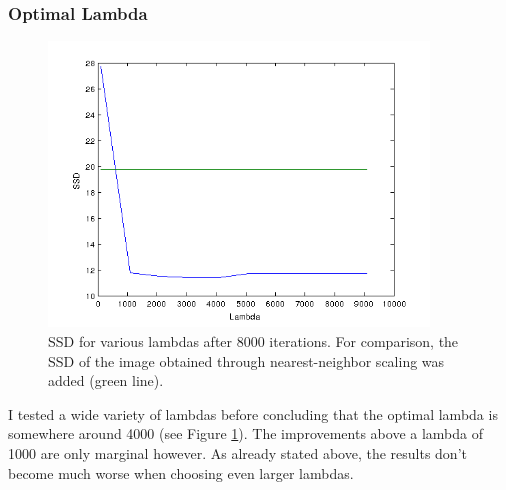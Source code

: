 \documentclass{paper}
\begin{document}
\clearpage
\subsubsection*{Optimal Lambda}
\begin{figure}[ht!]%
\centering
\includegraphics[width=0.9\textwidth]{lambda_vs_ssd.png}
\caption{SSD for various lambdas after 8000 iterations. For comparison, the
SSD of the image obtained through nearest-neighbor scaling was added (green line).}
\label{fig:lambda_vs_ssd}
\end{figure}
I tested a wide variety of lambdas before concluding that the optimal lambda
is somewhere around 4000 (see Figure \ref{fig:lambda_vs_ssd}). The improvements above a lambda
of 1000 are only marginal however. 
As already stated above, the results don't become
much worse when choosing even larger lambdas.
\end{document}

